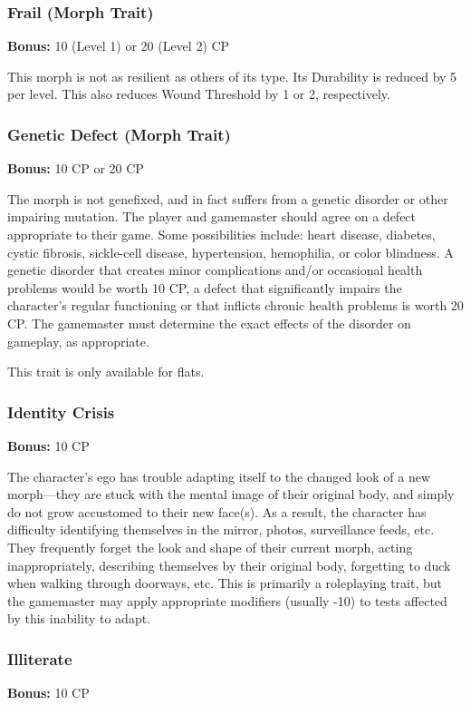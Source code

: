 \subsubsection{Frail (Morph Trait)}
\textbf{Bonus:} 10 (Level 1) or 20 (Level 2) CP

This morph is not as resilient as others of its type.  Its Durability is
reduced by 5 per level. This also reduces Wound Threshold by 1 or 2,
respectively.

\subsubsection{Genetic Defect (Morph Trait)}
\textbf{Bonus:} 10 CP or 20 CP

The morph is not genefixed, and in fact suffers from a genetic disorder or
other impairing mutation.  The player and gamemaster should agree on a defect
appropriate to their game. Some possibilities include: heart disease, diabetes,
cystic fibrosis, sickle-cell disease, hypertension, hemophilia, or color
blindness.  A genetic disorder that creates minor complications and/or
occasional health problems would be worth 10 CP, a defect that significantly
impairs the character’s regular functioning or that inflicts chronic health
problems is worth 20 CP. The gamemaster must determine the exact effects of
the disorder on gameplay, as appropriate.

This trait is only available for flats.

\subsubsection{Identity Crisis}
\textbf{Bonus:} 10 CP

The character’s ego has trouble adapting itself to the changed look of a new
morph—they are stuck with the mental image of their original body, and simply
do not grow accustomed to their new face(s).  As a result, the character has
difficulty identifying themselves in the mirror, photos, surveillance feeds,
etc. They frequently forget the look and shape of their current morph, acting
inappropriately, describing themselves by their original body, forgetting to
duck when walking through doorways, etc. This is primarily a roleplaying
trait, but the gamemaster may apply appropriate modifiers (usually -10) to
tests affected by this inability to adapt.

\subsubsection{Illiterate}
\textbf{Bonus:} 10 CP

